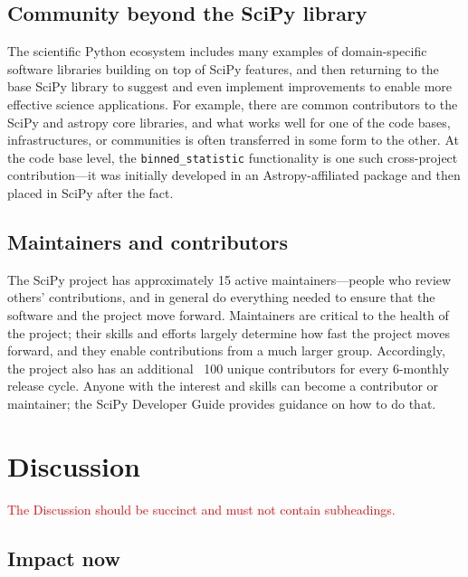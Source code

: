 \documentclass[fleqn,10pt]{wlscirep}
\newcommand{\fixme}[1]{\textcolor{red}{{#1}}}
\begin{document}
\subsection*{Community beyond the SciPy library}

The scientific Python ecosystem includes many examples
of domain-specific software libraries building on top
of SciPy features, and then returning to the base SciPy library
to suggest and even implement improvements to enable
more effective science applications. For example, there
are common contributors to the SciPy and astropy core
libraries\cite{astropy-2018}, and what works well for 
one of the code bases, infrastructures, or communities 
is often transferred in some form to the other. At the code
base level, the \texttt{binned\_statistic} functionality
is one such cross-project contribution---it was initially
developed in an Astropy-affiliated package
and then placed in SciPy after the fact.

\subsection*{Maintainers and contributors}

The SciPy project has approximately 15 active maintainers---people who review
others' contributions, and in general do everything needed to ensure that the
software and the project move forward. Maintainers are critical to the health
of the project\cite{eghbal2016}; their skills and efforts largely determine how
fast the project moves forward, and they enable contributions from a much
larger group. Accordingly, the project also has an additional ~100 unique
contributors for every 6-monthly release cycle. Anyone with the interest and
skills can become a contributor or maintainer; the SciPy Developer
Guide\cite{scipy-dev-guide} provides guidance on how to do that.

\section*{Discussion}

\fixme{The Discussion should be succinct and must not contain subheadings.}

\subsection*{Impact now}

\end{document}

